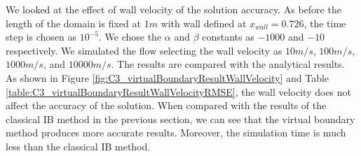 We looked at the effect of wall velocity of the solution accuracy. As before the length of the domain is fixed at $1 m$ with wall defined at $x_{wall} = 0.726$, the time step is chosen as $10^{-5}$. We chose the $\alpha$ and $\beta$ constants as $-1000$ and $-10$ respectively. We simulated the flow selecting the wall velocity as $10 m/s$, $100 m/s$, $1000 m/s$, and $10000 m/s$. The results are compared with the analytical results. As shown in Figure \ref{fig:C3_virtualBoundaryResultWallVelocity} and Table \ref{table:C3_virtualBoundaryResultWallVelocityRMSE}, the wall velocity does not affect the accuracy of the solution. When compared with the results of the classical IB method in the previous section, we can see that the virtual boundary method produces more accurate results. Moreover, the simulation time is much less than the classical IB method.

